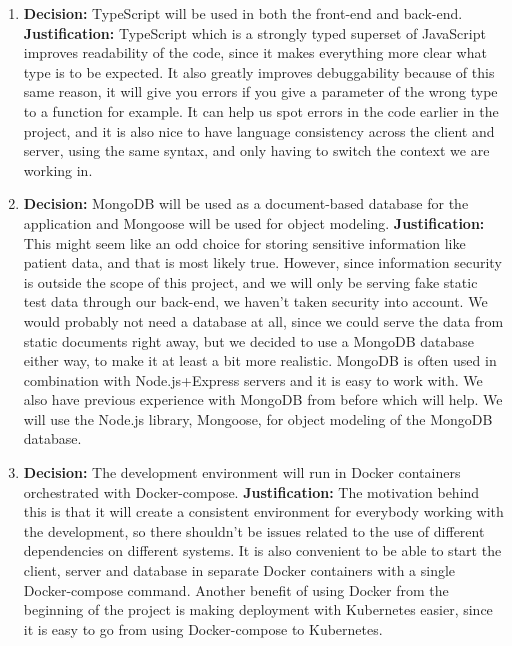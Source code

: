 \documentclass{article}
\begin{document}
\begin{enumerate}
      \item \textbf{Decision:} TypeScript will be used in both the front-end and back-end.
    \linebreak{}
    \textbf{Justification:} TypeScript which is a strongly typed superset of JavaScript improves readability of the code, since it makes everything more clear what type is to be expected. It also greatly improves debuggability because of this same reason, it will give you errors if you give a parameter of the wrong type to a function for example. It can help us spot errors in the code earlier in the project, and it is also nice to have language consistency across the client and server, using the same syntax, and only having to switch the context we are working in. 
    
     \item \textbf{Decision:} MongoDB will be used as a document-based database for the application and Mongoose will be used for object modeling.
    \linebreak{}
    \textbf{Justification:} This might seem like an odd choice for storing sensitive information like patient data, and that is most likely true. However, since information security is outside the scope of this project, and we will only be serving fake static test data through our back-end, we haven't taken security into account. We would probably not need a database at all, since we could serve the data from static documents right away, but we decided to use a MongoDB database either way, to make it at least a bit more realistic. MongoDB is often used in combination with Node.js+Express servers and it is easy to work with. We also have previous experience with MongoDB from before which will help. We will use the Node.js library, Mongoose, for object modeling of the MongoDB database.
    
      \item \textbf{Decision:} The development environment will run in Docker containers orchestrated with Docker-compose.
    \linebreak{}
    \textbf{Justification:} The motivation behind this is that it will create a consistent environment for everybody working with the development, so there shouldn't be issues related to the use of different dependencies on different systems. It is also convenient to be able to start the client, server and database in separate Docker containers with a single Docker-compose command. Another benefit of using Docker from the beginning of the project is making deployment with Kubernetes easier, since it is easy to go from using Docker-compose to Kubernetes.
    

\end{enumerate}
\end{document}
